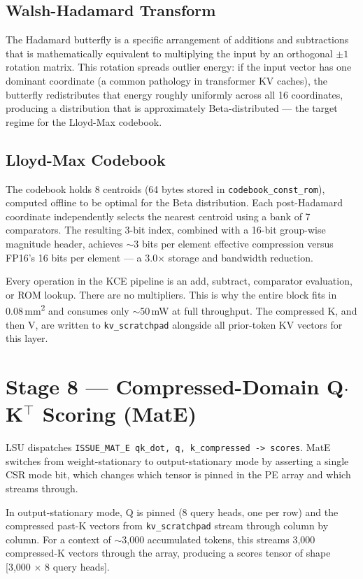 \documentclass[11pt,letterpaper]{article}
\begin{document}
\subsection{Walsh-Hadamard Transform}

The Hadamard butterfly is a specific arrangement of additions and subtractions that is
mathematically equivalent to multiplying the input by an orthogonal $\pm 1$ rotation matrix.
This rotation spreads outlier energy: if the input vector has one dominant coordinate (a
common pathology in transformer KV caches), the butterfly redistributes that energy roughly
uniformly across all 16 coordinates, producing a distribution that is approximately
Beta-distributed --- the target regime for the Lloyd-Max codebook.

\subsection{Lloyd-Max Codebook}

The codebook holds 8 centroids (64 bytes stored in \texttt{codebook\_const\_rom}), computed
offline to be optimal for the Beta distribution. Each post-Hadamard coordinate independently
selects the nearest centroid using a bank of 7 comparators. The resulting 3-bit index,
combined with a 16-bit group-wise magnitude header, achieves $\sim$3 bits per element
effective compression versus FP16's 16 bits per element --- a 3.0$\times$ storage and
bandwidth reduction.

Every operation in the KCE pipeline is an add, subtract, comparator evaluation, or ROM
lookup. There are no multipliers. This is why the entire block fits in 0.08\,mm\textsuperscript{2} and consumes
only $\sim$50\,mW at full throughput. The compressed K, and then V, are written to
\texttt{kv\_scratchpad} alongside all prior-token KV vectors for this layer.

\section{Stage 8 --- Compressed-Domain Q$\cdot$K$^\top$ Scoring (MatE)}

LSU dispatches \texttt{ISSUE\_MAT\_E qk\_dot, q, k\_compressed -> scores}. MatE switches from
weight-stationary to output-stationary mode by asserting a single CSR mode bit, which changes
which tensor is pinned in the PE array and which streams through.

In output-stationary mode, Q is pinned (8 query heads, one per row) and the compressed past-K
vectors from \texttt{kv\_scratchpad} stream through column by column. For a context of
$\sim$3{,}000 accumulated tokens, this streams 3{,}000 compressed-K vectors through the
array, producing a scores tensor of shape [3{,}000 $\times$ 8 query heads].
\end{document}
